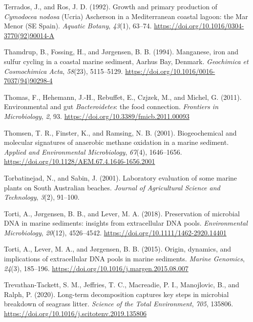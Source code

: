 \documentclass[
  12 pt,
]{book}
\newlength{\cslhangindent}
\newlength{\cslentryspacingunit} %
\newenvironment{CSLReferences}[2] %
 {%
  \setlength{\parindent}{0pt}
  \ifodd #1
  \let\oldpar\par
  \def\par{\hangindent=\cslhangindent\oldpar}
  \fi
  \setlength{\parskip}{#2\cslentryspacingunit}
 }%
 {}
\begin{document}
\begin{CSLReferences}{1}{0}
\leavevmode{}%
Terrados, J., and Ros, J. D. (1992). Growth and primary production of {{\emph{Cymodocea nodosa}}} ({Ucria}) {Ascherson} in a {Mediterranean} coastal lagoon: the {Mar Menor} ({SE Spain}). \emph{Aquatic Botany}, \emph{43}(1), 63--74. \url{https://doi.org/10.1016/0304-3770(92)90014-A}

\leavevmode{}%
Thamdrup, B., Fossing, H., and Jørgensen, B. B. (1994). Manganese, iron and sulfur cycling in a coastal marine sediment, {Aarhus Bay}, {Denmark}. \emph{Geochimica et Cosmochimica Acta}, \emph{58}(23), 5115--5129. \url{https://doi.org/10.1016/0016-7037(94)90298-4}

\leavevmode{}%
Thomas, F., Hehemann, J.-H., Rebuffet, E., Czjzek, M., and Michel, G. (2011). Environmental and gut {{\emph{Bacteroidetes}}}: the food connection. \emph{Frontiers in Microbiology}, \emph{2}, 93. \url{https://doi.org/10.3389/fmicb.2011.00093}

\leavevmode{}%
Thomsen, T. R., Finster, K., and Ramsing, N. B. (2001). Biogeochemical and molecular signatures of anaerobic methane oxidation in a marine sediment. \emph{Applied and Environmental Microbiology}, \emph{67}(4), 1646--1656. \url{https://doi.org/10.1128/AEM.67.4.1646-1656.2001}

\leavevmode{}%
Torbatinejad, N., and Sabin, J. (2001). Laboratory evaluation of some marine plants on {South Australian} beaches. \emph{Journal of Agricultural Science and Technology}, \emph{3}(2), 91--100.

\leavevmode{}%
Torti, A., Jørgensen, B. B., and Lever, M. A. (2018). Preservation of microbial {DNA} in marine sediments: insights from extracellular {DNA} pools. \emph{Environmental Microbiology}, \emph{20}(12), 4526--4542. \url{https://doi.org/10.1111/1462-2920.14401}

\leavevmode{}%
Torti, A., Lever, M. A., and Jørgensen, B. B. (2015). Origin, dynamics, and implications of extracellular {DNA} pools in marine sediments. \emph{Marine Genomics}, \emph{24}(3), 185--196. \url{https://doi.org/10.1016/j.margen.2015.08.007}

\leavevmode{}%
Trevathan-Tackett, S. M., Jeffries, T. C., Macreadie, P. I., Manojlovic, B., and Ralph, P. (2020). Long-term decomposition captures key steps in microbial breakdown of seagrass litter. \emph{Science of the Total Environment}, \emph{705}, 135806. \url{https://doi.org/10.1016/j.scitotenv.2019.135806}


\end{CSLReferences}
\end{document}
